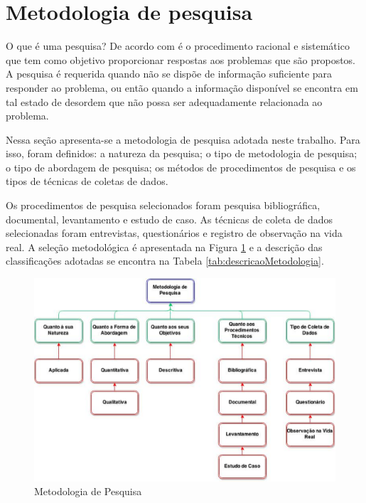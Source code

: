 \section{Metodologia de pesquisa}

O que é uma pesquisa? De acordo com \cite{gil_como_2002} é o procedimento racional e sistemático que tem como objetivo proporcionar respostas aos problemas que são propostos. A pesquisa é requerida quando não se dispõe de informação suficiente para responder ao
problema, ou então quando a informação disponível se encontra em tal estado de desordem que não possa ser adequadamente relacionada ao problema.

Nessa seção apresenta-se a metodologia de pesquisa adotada neste trabalho. Para
isso, foram definidos: a natureza da pesquisa; o tipo de metodologia de pesquisa; o tipo de abordagem de pesquisa; os métodos de procedimentos de pesquisa e os tipos de técnicas
de coletas de dados.

Os procedimentos de pesquisa selecionados foram pesquisa bibliográfica, documental, levantamento e estudo de caso. As técnicas de coleta de dados selecionadas foram
entrevistas, questionários e registro de observação na vida real. A seleção metodológica é apresentada na Figura \ref{7eixosqualidade} e a descrição das classificações adotadas se encontra na Tabela \ref{tab:descricaoMetodologia}.

\begin{figure}[h!]
\centering
\includegraphics[keepaspectratio=false,scale=0.5]{figuras/figuras_nilton/selecaoMetodologica.eps}
\caption{Metodologia de Pesquisa}
\label{7eixosqualidade}
\end{figure}

